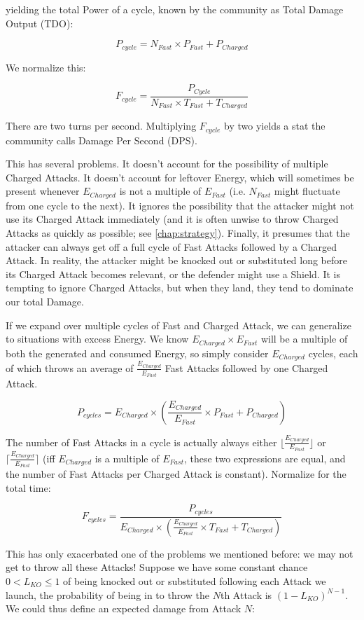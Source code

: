 yielding the total Power of a cycle, known by the community as Total Damage Output (TDO):

\[ P_{cycle} = N_{Fast} \times P_{Fast} + P_{Charged} \]

We normalize this:

\[ F_{cycle} = \frac{P_{Cycle}}{N_{Fast} \times T_{Fast} + T_{Charged}} \]

There are two turns per second. Multiplying $F_{cycle}$ by two yields a
  stat the community calls Damage Per Second (DPS).

This has several problems. It doesn't account for the possibility of multiple
Charged Attacks. It doesn't account for leftover Energy, which will sometimes
be present whenever $E_{Charged}$ is not a multiple of $E_{Fast}$ (i.e. $N_{Fast}$
might fluctuate from one cycle to the next). It ignores the possibility that
the attacker might not use its Charged Attack immediately (and it is often
unwise to throw Charged Attacks as quickly as possible; see
\autoref{chap:strategy}). Finally, it presumes that the attacker can always get
off a full cycle of Fast Attacks followed by a Charged Attack. In reality, the
attacker might be knocked out or substituted long before its Charged Attack
becomes relevant, or the defender might use a Shield. It is tempting to ignore
Charged Attacks, but when they land, they tend to dominate our total Damage.

If we expand over multiple cycles of Fast and Charged Attack, we can
 generalize to situations with excess Energy. We know $E_{Charged} \times
 E_{Fast}$ will be a multiple of both the generated and consumed Energy, so
 simply consider $E_{Charged}$ cycles, each of which throws an average of
 $\frac{E_{Charged}}{E_{Fast}}$ Fast Attacks followed by one Charged Attack.

\[ P_{cycles} = E_{Charged} \times (\frac{E_{Charged}}{E_{Fast}} \times P_{Fast} + P_{Charged}) \]

 The number of Fast Attacks in a cycle is actually always either
 $\lfloor\frac{E_{Charged}}{E_{Fast}}\rfloor$
 or $\lceil\frac{E_{Charged}}{E_{Fast}}\rceil$ (iff $E_{Charged}$ is a multiple of
 $E_{Fast}$, these two expressions are equal, and the number of Fast Attacks
 per Charged Attack is constant). Normalize for the total time:

\[ F_{cycles} = \frac{P_{cycles}}{E_{Charged} \times (\frac{E_{Charged}}{E_{Fast}} \times T_{Fast} + T_{Charged})} \]

This has only exacerbated one of the problems we mentioned before: we may
  not get to throw all these Attacks!
Suppose we have some constant chance $0 < L_{KO} \leq 1$ of being knocked out or
 substituted following each Attack we launch, the probability of being
 in to throw the $N$th Attack is $(1 - L_{KO})^{N-1}$.
We could thus define an expected damage from Attack $N$:

